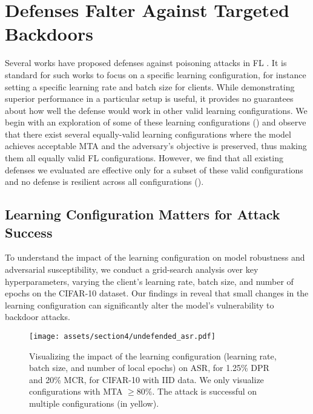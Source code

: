 \section{Defenses Falter Against Targeted Backdoors}
\label{sec:existing_finicky}

Several works have proposed defenses against poisoning attacks in FL \citep{zhang2023flip, nguyen2022flame, blanchard2017machine, yin2018byzantine,fung2018mitigating,cao2021fltrust,wang2022flare,pillutla2022robust,shejwalkar2021manipulating}. It is standard for such works to focus on a specific learning configuration, for instance setting a specific learning rate and batch size for clients. While demonstrating superior performance in a particular setup is useful, it provides no guarantees about how well the defense would work in other valid learning configurations. We begin with an exploration of some of these learning configurations () and observe that there exist several equally-valid learning configurations where the model achieves acceptable MTA and the adversary's objective is preserved, thus making them all equally valid FL configurations. However, we find that all existing defenses we evaluated are effective only for a subset of these valid configurations and no defense is resilient across all configurations ().

\subsection{Learning Configuration Matters for Attack Success}
\label{sec:fl_setup_matters}

To understand the impact of the learning configuration on model robustness and adversarial susceptibility, we conduct a grid-search analysis over key hyperparameters, varying the client's learning rate, batch size, and number of epochs on the CIFAR-10 dataset.
Our findings in  reveal that small changes in the learning configuration can significantly alter the model’s vulnerability to backdoor attacks.
\begin{figure}[h!]
    \texttt{[image: assets/section4/undefended\_asr.pdf]}
    \caption{Visualizing the impact of the learning configuration (learning rate, batch size, and number of local epochs) on ASR, for 1.25\% DPR and 20\% MCR, for CIFAR-10 with IID data. We only visualize configurations with MTA $\geq80\%$. The attack is successful on multiple configurations (in yellow).}
    \label{fig:fl_setup_impact}
\end{figure}

